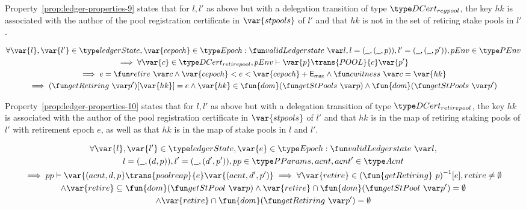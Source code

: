 Property~\ref{prop:ledger-properties-9} states that for $l, l'$ as above but
with a delegation transition of type $\DCertRegPool$, the key $hk$ is associated
with the author of the pool registration certificate in $\var{stpools}$ of $l'$
and that $hk$ is not in the set of retiring stake pools in $l'$.

\begin{property}
  \begin{multline*}
    \forall \var{l}, \var{l'} \in \ledgerState, \var{cepoch} \in \Epoch:
    \applyFun{validLedgerstate}{l},
    l = (\wcard, (\wcard,p)), l' = (\wcard, (\wcard,p')), pEnv\in\PEnv \\
    \implies \forall \var{c} \in \DCertRetirePool, pEnv\vdash\var{p}
    \trans{POOL}{c} \var{p'} \\ \implies e = \applyFun{retire}{c} \wedge
    \var{cepoch} < e < \var{cepoch} + \emax \wedge \applyFun{cwitness}{c} =
    \var{hk}\\ \implies (\applyFun{getRetiring}{p'})[\var{hk}] = e \wedge
    \var{hk} \in
    \fun{dom}(\applyFun{getStPools}{p})\wedge\fun{dom}(\applyFun{getStPools}{p'}
    )
  \end{multline*}
  \label{prop:ledger-properties-10}
\end{property}

Property~\ref{prop:ledger-properties-10} states that for $l, l'$ as above but
with a delegation transition of type $\DCertRetirePool$, the key $hk$ is
associated with the author of the pool registration certificate in
$\var{stpools}$ of $l'$ and that $hk$ is in the map of retiring staking pools of
$l'$ with retirement epoch $e$, as well as that $hk$ is in the map of stake
pools in $l$ and $l'$.

\begin{property}
  \begin{multline*}
    \forall \var{l}, \var{l'} \in \ledgerState, \var{e} \in \Epoch:
    \applyFun{validLedgerstate}{l},\\
    l = (\wcard, (d, p)), l' = (\wcard, (d', p')), pp\in\PParams, acnt, acnt'\in\Acnt \\
    \implies pp\vdash\var{(acnt, d, p} \trans{poolreap}{e} \var{(acnt, d', p')}
    \implies \forall \var{retire}\in{(\fun{getRetiring}~p)}^{-1}[e], retire \neq
    \emptyset \\ \wedge \var{retire} \subseteq
    \fun{dom}(\applyFun{getStPool}{p}) \wedge
    \var{retire} \cap\fun{dom}(\applyFun{getStPool}{p'})=\emptyset \\
    \wedge\var{retire} \cap \fun{dom}(\applyFun{getRetiring}{p'}) = \emptyset
  \end{multline*}
  \label{prop:ledger-properties-11}
\end{property}

